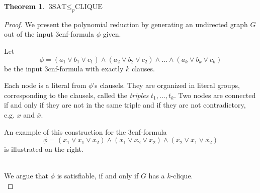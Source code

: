 \documentclass[10pt,fleqn]{article}
\theoremstyle{definition}
\newtheorem{theorem}{Theorem}
\theoremstyle{remark}
\newcommand{\cliqueprob}{\text{CLIQUE}}
\newcommand{\threesatprob}{\text{3SAT}}
\begin{document}
\begin{theorem} \(\threesatprob \leq_p \cliqueprob\)
\end{theorem}

\begin{proof} We present the polynomial reduction by generating an undirected graph \(G\) out of the input 3cnf-formula \(\phi\) given.

    \begin{minipage}{0.6\linewidth}
        Let
        \[
            \phi = (a_1 \lor b_1 \lor c_1) \land (a_2 \lor b_2 \lor c_2) \land ... \land (a_k \lor b_k \lor c_k)
        \]
        be the input 3cnf-formula with exactly \(k\) clauses.

        Each node is a literal from \(\phi\)'s clausels. They are organized in literal groups, corresponding to the clausels, called the \emph{triples} \(t_1, ..., t_k\). Two nodes are connected if and only if they are not in the same triple and if they are not contradictory, e.g. \(x\) and \(\overline{x}\).

        An example of this construction for the 3cnf-formula \[\phi = (x_1 \lor \overline{x_1} \lor \overline{x_2}) \land (\overline{x_1} \lor x_2 \lor \overline{x_2}) \land (\overline{x_2} \lor x_1 \lor \overline{x_2})\] is illustrated on the right.
    \end{minipage}
    \begin{minipage}{0.4\linewidth}
        \centering
    \end{minipage}\\

    We argue that \(\phi\) is satisfiable, if and only if \(G\) has a \(k\)-clique.\\


\end{proof}
\end{document}
